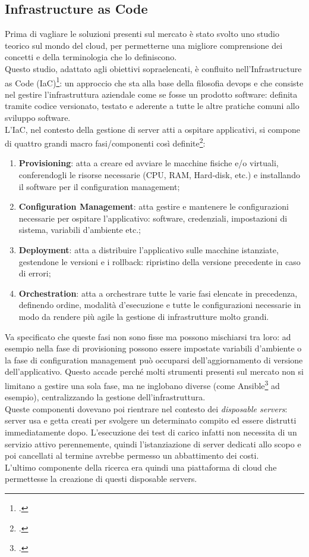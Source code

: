 \subsection{Infrastructure as Code}
Prima di vagliare le soluzioni presenti sul mercato è stato svolto uno studio teorico sul mondo del \gls{cloud}, per permetterne una migliore comprensione dei concetti e della terminologia che lo definiscono. \\
Questo studio, adattato agli obiettivi sopraelencati, è confluito nell'Infrastructure as Code (IaC)\footcite{article:iac}: un approccio che sta alla base della filosofia \gls{devops} e che consiste nel gestire l'infrastruttura aziendale come se fosse un prodotto software: definita tramite codice versionato, testato e aderente a tutte le altre pratiche comuni allo sviluppo software. \\
L'IaC, nel contesto della gestione di server atti a ospitare applicativi, si compone di quattro grandi macro fasi/componenti così definite\footcite{article:iac-components}:
\begin{enumerate}
	\item \textbf{Provisioning}: atta a creare ed avviare le macchine fisiche e/o virtuali, conferendogli le risorse necessarie (CPU, RAM, Hard-disk, etc.) e installando il software per il configuration management;
	\item \textbf{Configuration Management}: atta gestire e mantenere le configurazioni necessarie per ospitare l'applicativo: software, credenziali, impostazioni di sistema, variabili d'ambiente etc.;
	\item \textbf{Deployment}: atta a distribuire l'applicativo sulle macchine istanziate, gestendone le versioni e i rollback: ripristino della versione precedente in caso di errori;
	\item \textbf{Orchestration}: atta a orchestrare tutte le varie fasi elencate in precedenza, definendo ordine, modalità d'esecuzione e tutte le configurazioni necessarie in modo da rendere più agile la gestione di infrastrutture molto grandi.
\end{enumerate}
Va specificato che queste fasi non sono fisse ma possono mischiarsi tra loro: ad esempio nella fase di provisioning possono essere impostate variabili d'ambiente o la fase di configuration management può occuparsi dell'aggiornamento di versione dell'applicativo. Questo accade perché molti strumenti presenti sul mercato non si limitano a gestire una sola fase, ma ne inglobano diverse (come Ansible\footcite{site:ansible} ad esempio), centralizzando la gestione dell'infrastruttura. \\
Queste componenti dovevano poi rientrare nel contesto dei \textit{disposable servers}: server usa e getta creati per svolgere un determinato compito ed essere distrutti immediatamente dopo. L'esecuzione dei test di carico infatti non necessita di un servizio attivo perennemente, quindi l'istanziazione di server dedicati allo scopo e poi cancellati al termine avrebbe permesso un abbattimento dei costi. \\
L'ultimo componente della ricerca era quindi una piattaforma di \gls{cloud} che permettesse la creazione di questi disposable servers.
